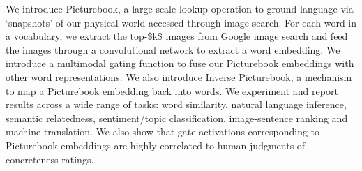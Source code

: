 We introduce Picturebook, a large-scale lookup operation to ground language via `snapshots' of our physical world accessed through image search. For each word in a vocabulary, we extract the top-\$k\$ images from Google image search and feed the images through a convolutional network to extract a word embedding. We introduce a multimodal gating function to fuse our Picturebook embeddings with other word representations. We also introduce Inverse Picturebook, a mechanism to map a Picturebook embedding back into words. We experiment and report results across a wide range of tasks: word similarity, natural language inference, semantic relatedness, sentiment/topic classification, image-sentence ranking and machine translation. We also show that gate activations corresponding to Picturebook embeddings are highly correlated to human judgments of concreteness ratings.
